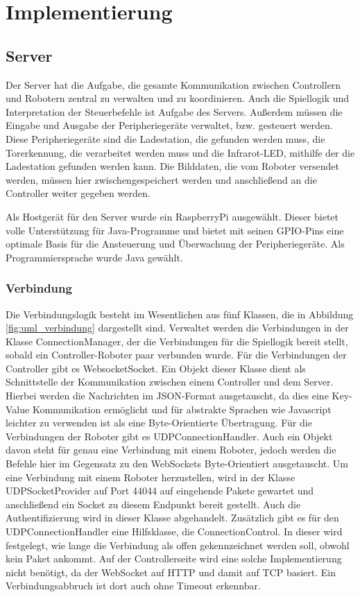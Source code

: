 \chapter{Implementierung}
\label{ch:implementierung}

\section{Server}
\label{impl:server}
Der Server hat die Aufgabe, die gesamte Kommunikation zwischen Controllern und Robotern zentral zu verwalten und zu koordinieren. Auch die Spiellogik und Interpretation der Steuerbefehle ist Aufgabe des Servers. Außerdem müssen die Eingabe und Ausgabe der Peripheriegeräte verwaltet, bzw. gesteuert werden. Diese Peripheriegeräte sind die Ladestation, die gefunden werden muss, die Torerkennung, die verarbeitet werden muss und die Infrarot-LED, mithilfe der die Ladestation gefunden werden kann. Die Bilddaten, die vom Roboter versendet werden, müssen hier zwischengespeichert werden und anschließend an die Controller weiter gegeben werden.

Als Hostgerät für den Server wurde ein RaspberryPi ausgewählt. Dieser bietet volle Unterstützung für Java-Programme und bietet mit seinen GPIO-Pins eine optimale Basis für die Ansteuerung und Überwachung der Peripheriegeräte. 
Als Programmiersprache wurde Java gewählt.


\subsection{Verbindung}
Die Verbindungslogik besteht im Wesentlichen aus fünf Klassen, die in Abbildung \ref{fig:uml_verbindung} dargestellt sind. Verwaltet werden die Verbindungen in der Klasse ConnectionManager, der die Verbindungen für die Spiellogik bereit stellt, sobald ein Controller-Roboter paar verbunden wurde. Für die Verbindungen der Controller gibt es WebsocketSocket. Ein Objekt dieser Klasse dient als Schnittstelle der Kommunikation zwischen einem Controller und dem Server. Hierbei werden die Nachrichten im JSON-Format ausgetauscht, da dies eine Key-Value Kommunikation ermöglicht und für abstrakte Sprachen wie Javascript leichter zu verwenden ist als eine Byte-Orientierte Übertragung. Für die Verbindungen der Roboter gibt es UDPConnectionHandler. Auch ein Objekt davon steht für genau eine Verbindung mit einem Roboter, jedoch werden die Befehle hier im Gegensatz zu den WebSockets Byte-Orientiert ausgetauscht. Um eine Verbindung mit einem Roboter herzustellen, wird in der Klasse UDPSocketProvider auf Port 44044 auf eingehende Pakete gewartet und anschließend ein Socket zu diesem Endpunkt bereit gestellt. Auch die Authentifizierung wird in dieser Klasse abgehandelt. Zusätzlich gibt es für den UDPConnectionHandler eine Hilfsklasse, die ConnectionControl. In dieser wird festgelegt, wie lange die Verbindung als offen gekennzeichnet werden soll, obwohl kein Paket ankommt. Auf der Controllerseite wird eine solche Implementierung nicht benötigt, da der WebSocket auf HTTP und damit auf TCP basiert. Ein Verbindungsabbruch ist dort auch ohne Timeout erkennbar.


